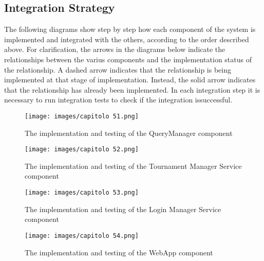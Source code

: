 \documentclass[a4paper, 11pt, titlepage]{article}
\begin{document}
\subsection{Integration Strategy}
The following diagrams show step by step how each component of the system is implemented
and integrated with the others, according to the order described above.
For clarification, the arrows in the diagrams below indicate the relationships between the varius components and the implementation status of the relationship.
A dashed arrow indicates that the relationship is being implemented at that stage of implementation. Instead, the solid arrow indicates that the relationship has already been implemented.
In each integration step it is necessary to run integration tests to check if the integration issuccessful.

\begin{figure}[H]
  \centering
  \texttt{[image: images/capitolo 51.png]}
  \caption{The implementation and testing of the QueryManager component}
  \label{fig:Query}
\end{figure}

\begin{figure}[H]
  \centering
  \texttt{[image: images/capitolo 52.png]}
  \caption{The implementation and testing of the Tournament Manager Service component}
  \label{fig:Tournament}
\end{figure}

\begin{figure}[H]
  \centering
  \texttt{[image: images/capitolo 53.png]}
  \caption{The implementation and testing of the Login Manager Service component}
  \label{fig:Login}
\end{figure}

\begin{figure}[H]
  \centering
  \texttt{[image: images/capitolo 54.png]}
  \caption{The implementation and testing of the WebApp component}
  \label{fig:WebApp}
\end{figure}
\end{document}
